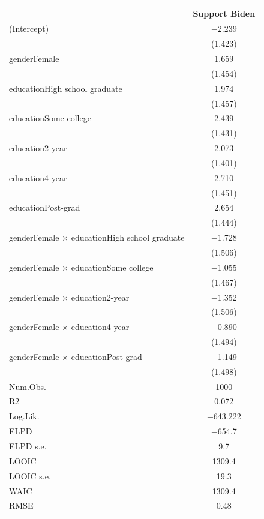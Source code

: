 \documentclass[
  letterpaper,
  DIV=11,
  numbers=noendperiod]{scrartcl}
\begin{document}
\begin{table}
\centering
\begin{tabular}[t]{lc}
\toprule
  & Support Biden\\
\midrule
(Intercept) & \num{-2.239}\\
 & (\num{1.423})\\
genderFemale & \num{1.659}\\
 & (\num{1.454})\\
educationHigh school graduate & \num{1.974}\\
 & (\num{1.457})\\
educationSome college & \num{2.439}\\
 & (\num{1.431})\\
education2-year & \num{2.073}\\
 & (\num{1.401})\\
education4-year & \num{2.710}\\
 & (\num{1.451})\\
educationPost-grad & \num{2.654}\\
 & (\num{1.444})\\
genderFemale × educationHigh school graduate & \num{-1.728}\\
 & \vphantom{1} (\num{1.506})\\
genderFemale × educationSome college & \num{-1.055}\\
 & (\num{1.467})\\
genderFemale × education2-year & \num{-1.352}\\
 & (\num{1.506})\\
genderFemale × education4-year & \num{-0.890}\\
 & (\num{1.494})\\
genderFemale × educationPost-grad & \num{-1.149}\\
 & (\num{1.498})\\
\midrule
Num.Obs. & \num{1000}\\
R2 & \num{0.072}\\
Log.Lik. & \num{-643.222}\\
ELPD & \num{-654.7}\\
ELPD s.e. & \num{9.7}\\
LOOIC & \num{1309.4}\\
LOOIC s.e. & \num{19.3}\\
WAIC & \num{1309.4}\\
RMSE & \num{0.48}\\
\bottomrule
\end{tabular}
\end{table}
\end{document}
